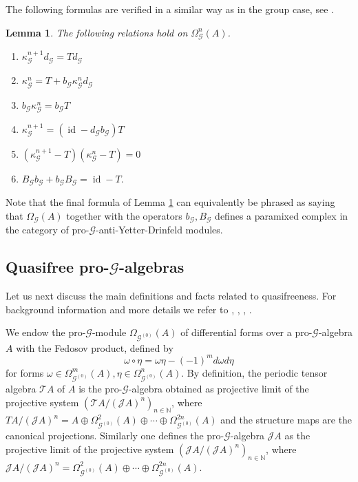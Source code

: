 \documentclass{amsart}
\newtheorem{lemma}[thm]{Lemma}
\newcommand{\G}{\mathcal{G}}
\newcommand{\J}{\mathcal{J}}
\newcommand{\T}{\mathcal{T}}
\DeclareMathOperator{\id}{id}
\begin{document}
The following formulas are verified in a similar way as in the group case, see \cite[Lemma 7.2]{VOIGT_equivariantperiodiccyclichomology}.

\begin{lemma} \label{lemma: properties of bounderies}
The following relations hold on $ \Omega^n_\G(A) $. 
\begin{enumerate}
\item $ \kappa_\G^{n + 1} d_\G = T d_\G $
\item $ \kappa_\G^n = T + b_{\G} \kappa_\G^n d_\G $
\item $ b_\G \kappa_\G^n = b_\G T $
\item $ \kappa_\G^{n + 1} = (\id - d_\G b_\G) T $
\item $ (\kappa_\G^{n + 1} - T)(\kappa_\G^n - T) = 0 $
\item $ B_\G b_\G + b_\G B_\G = \id - T. $
\end{enumerate}
\end{lemma}

Note that the final formula of Lemma \ref{lemma: properties of bounderies} can equivalently be phrased as saying that $ \Omega_\G(A) $ together with the operators $ b_\G, B_\G $ defines a paramixed complex in the category of pro-$ \G $-anti-Yetter-Drinfeld modules. 

\subsection{Quasifree pro-$ \G $-algebras} 

Let us next discuss the main definitions and facts related to quasifreeness. For background information and more details we refer 
to \cite{CUNTZ_QUILLEN_algebraextensions}, \cite{MEYER_thesis}, \cite{VOIGT_thesis}, \cite{VOIGT_equivariantperiodiccyclichomology}. 

We endow the pro-$ \G $-module $ \Omega_{\G^{(0)}}(A) $ of differential forms over a pro-$ \G $-algebra $ A $ with the Fedosov product, defined by  
$$ 
\omega \circ \eta = \omega \eta -(-1)^m d\omega d\eta
$$ 
for forms $ \omega \in \Omega_{\G^{(0)}}^m(A), \eta \in \Omega_{\G^{(0)}}^n(A) $. By definition, the periodic tensor algebra $ \T A $  of $ A $ is the pro-$ \G $-algebra obtained as projective limit of the projective system $ \left(\T A /(\J A)^n\right)_{n \in \mathbb{N}} $, 
where $ T A /(\J A)^n = A \oplus \Omega_{\G^{(0)}}^2(A) \oplus \cdots \oplus \Omega_{\G^{(0)}}^{2n}(A) $ and the structure maps are the canonical projections. 
Similarly one defines the pro-$ \G $-algebra $ \J A $ as the projective limit of the projective 
system $ (\J A /(\J A)^n)_{n \in \mathbb{N}} $, where $ \J A /(\J A)^n = \Omega_{\G^{(0)}}^2(A) \oplus \cdots \oplus \Omega_{\G^{(0)}}^{2n}(A) $.
\end{document}
